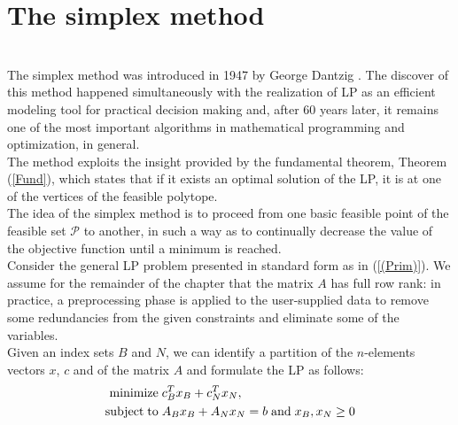 \documentclass[a4paper,10 pt,titlepage,twoside]{book}
\theoremstyle{plain}
\theoremstyle{definition}
\theoremstyle{remark}
\begin{document}
\chapter{The simplex method}\\
The simplex method was introduced in 1947 by George Dantzig \cite{DAN1}. The discover of this method happened simultaneously with the realization of LP as an efficient modeling tool for practical decision making and, after 60 years later, it remains one of the most important algorithms in mathematical programming and
optimization, in general.\\
The method exploits the insight provided by the fundamental theorem, Theorem
(\ref{Fund}), which states that if it exists an optimal solution of the LP, it is at one of the vertices of the feasible polytope. \\
The idea of the simplex method is to proceed from one basic feasible point of the feasible set $\mathcal{P}$ to another, in such a way as to continually decrease the value of the objective
function until a minimum is reached.\\ Consider the general LP problem presented in standard form as in (\ref{(Prim)}).
We assume for the remainder of the chapter that the matrix $A$ has full row rank: in practice, a preprocessing phase is applied to the user-supplied data to remove some
redundancies from the given constraints and eliminate some of the variables.\\Given an index sets $B$ and $N$, we can identify a partition of the $n$-elements vectors $x$, $c$ and of the matrix $A$ and formulate the LP as follows:
\begin{equation}
\begin{split}
\text{minimize\;} &c^{T}_{B}x_{B}+c^{T}_{N}x_{N},\\
\text{subject\;to\;}&A_{B}x_{B}+A_{N}x_{N} = b\text{\;and\;}x_{B}, x_{N}\geq0
\end{split}
\end{equation}
\end{document}
